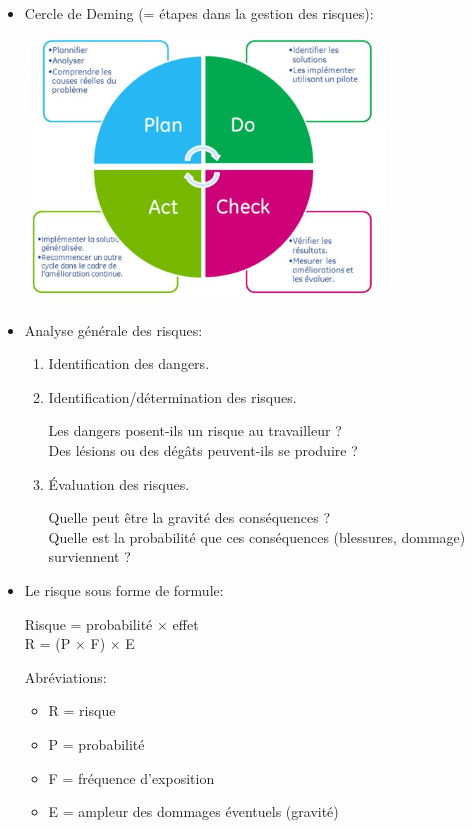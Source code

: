 \documentclass[a4paper]{article}
\begin{document}
\begin{itemize}
\item Cercle de Deming (= étapes dans la gestion des risques):
\begin{center}
\includegraphics[width=0.75\textwidth]{images/cercle-deming.jpg}
\end{center}





\item Analyse générale des risques:
\begin{enumerate}
    \item Identification des dangers.
    \item Identification/détermination des risques.
    \begin{example}
        Les dangers posent-ils un risque au travailleur ? \\
        Des lésions ou des dégâts peuvent-ils se produire ?
    \end{example}
    \item Évaluation des risques.
    \begin{example}
        Quelle peut être la gravité des conséquences ? \\
        Quelle est la probabilité que ces conséquences (blessures, dommage) surviennent ?
    \end{example}
\end{enumerate}





\item Le risque sous forme de formule:
\begin{center}
    Risque = probabilité $ \times $ effet \\
    R = (P $ \times $ F) $ \times $ E
\end{center}
Abréviations:
\begin{itemize}
    \item R = risque
    \item P = probabilité
    \item F = fréquence d'exposition
    \item E = ampleur des dommages éventuels (gravité)
\end{itemize}






\end{itemize}
\end{document}

